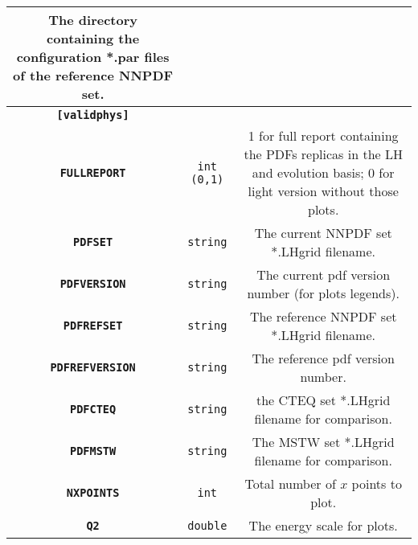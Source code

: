 \begin{table}[H]
\begin{centering}
\begin{tabular}{|c|c|c|}
\begin{minipage}[t]{0.5\columnwidth}%
The directory containing the configuration {*}.par files of the reference
NNPDF set.%
\end{minipage}\tabularnewline
\hline 
\hline 
\multicolumn{1}{|c}{\texttt{\textbf{{[}validphys{]}}}} & \multicolumn{1}{c}{} & \tabularnewline
\hline 
\hline 
\texttt{\textbf{FULLREPORT}} & \texttt{int (0,1)} & %
\begin{minipage}[t]{0.5\columnwidth}%
1 for full report containing the PDFs replicas in the LH and evolution
basis; 0 for light version without those plots.%
\end{minipage}\tabularnewline
\hline 
\texttt{\textbf{PDFSET}} & \texttt{string} & %
\begin{minipage}[t]{0.5\columnwidth}%
The current NNPDF set {*}.LHgrid filename.%
\end{minipage}\tabularnewline
\hline 
\texttt{\textbf{PDFVERSION}} & \texttt{string} & %
\begin{minipage}[t]{0.5\columnwidth}%
The current pdf version number (for plots legends).%
\end{minipage}\tabularnewline
\hline 
\texttt{\textbf{PDFREFSET}} & \texttt{string} & %
\begin{minipage}[t]{0.5\columnwidth}%
The reference NNPDF set {*}.LHgrid filename.%
\end{minipage}\tabularnewline
\hline 
\texttt{\textbf{PDFREFVERSION}} & \texttt{string} & %
\begin{minipage}[t]{0.5\columnwidth}%
The reference pdf version number.%
\end{minipage}\tabularnewline
\hline 
\texttt{\textbf{PDFCTEQ}} & \texttt{string} & %
\begin{minipage}[t]{0.5\columnwidth}%
the CTEQ set {*}.LHgrid filename for comparison.%
\end{minipage}\tabularnewline
\hline 
\texttt{\textbf{PDFMSTW}} & \texttt{string} & %
\begin{minipage}[t]{0.5\columnwidth}%
The MSTW set {*}.LHgrid filename for comparison.%
\end{minipage}\tabularnewline
\hline 
\texttt{\textbf{NXPOINTS}} & \texttt{int} & %
\begin{minipage}[t]{0.5\columnwidth}%
Total number of $x$ points to plot.%
\end{minipage}\tabularnewline
\hline 
\texttt{\textbf{Q2}} & \texttt{double} & %
\begin{minipage}[t]{0.5\columnwidth}%
The energy scale for plots.%
\end{minipage}\tabularnewline

\end{tabular}
\end{centering}
\end{table}
